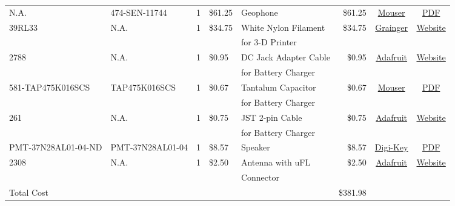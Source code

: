 \documentclass[11pt]{article}
\begin{document}
\begin{table}[H]
{\begin{tabular}{l|l|c|l|l|r|c|c}
		N.A. & 474-SEN-11744 & 1 & \$61.25 & Geophone & \$61.25 & \href{http://www.mouser.com/ProductDetail/SparkFun-Electronics/SEN-11744/?qs=\%2fha2pyFaduhLW6YoPw5UUIdTRP1X\%252btPruyfOHvl8\%2fY0\%3d}{Mouser} & \href{http://cdn.sparkfun.com/datasheets/Sensors/Accelerometers/SM-24\%20Brochure.pdf}{PDF} \\
    	 39RL33 & N.A. & 1 & \$34.75 & White Nylon Filament & \$34.75 & \href{https://www.grainger.com/product/FILABOT-White-Filament-39RL33}{Grainger} & \href{https://www.grainger.com/product/FILABOT-White-Filament-39RL33}{Website} \\
    	 & & & & for 3-D Printer & & \\
    	 2788 & N.A. & 1 & \$0.95 & DC Jack Adapter Cable & \$0.95 & \href{https://www.adafruit.com/products/2788}{Adafruit} & \href{https://www.adafruit.com/products/2788}{Website} \\
    	 & & & & for Battery Charger & & & \\
    	 581-TAP475K016SCS & TAP475K016SCS & 1 & \$0.67 & Tantalum Capacitor & \$0.67 & \href{http://www.mouser.com/ProductDetail/AVX/TAP475K016SCS/?qs=sGAEpiMZZMtZ1n0r9vR22d\%252b8XmbM9QM8L4TTXY3LGQ8\%3d}{Mouser} & \href{http://www.mouser.com/ds/2/40/tap-776819.pdf}{PDF} \\
    	 & & & & for Battery Charger & & & \\
    	 261 & N.A. & 1 & \$0.75 & JST 2-pin Cable & \$0.75 & \href{https://www.adafruit.com/product/261}{Adafruit} & \href{https://www.adafruit.com/product/261}{Website} \\
    	 & & & & for Battery Charger & & & \\
    	 	PMT-37N28AL01-04-ND & PMT-37N28AL01-04 & 1 & \$8.57 & Speaker & \$8.57 & \href{http://www.digikey.com/product-detail/en/peerless-by-tymphany/PMT-37N28AL01-04/PMT-37N28AL01-04-ND/6211115}{Digi-Key} & \href{http://www.tymphany.com/wp-content/themes/pathfinders/cache/pdfs/PMT-37N28AL01-04.pdf}{PDF} \\
        2308 & N.A. & 1 & \$2.50 & Antenna with uFL & \$2.50 & \href{https://www.adafruit.com/products/2308}{Adafruit} & \href{https://www.adafruit.com/products/2308}{Website} \\
    	 & & & & Connector & & & \\ \hline
    	Total Cost & & & & & \$381.98 &
	\end{tabular}%
	}
    \label{tab:bom}
\end{table}

\pagebreak
\end{document}
